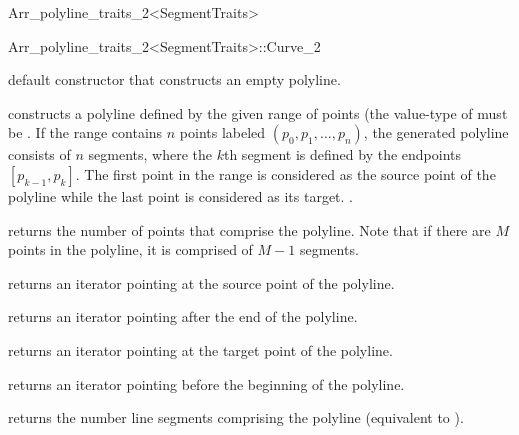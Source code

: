 \begin{ccRefClass}{Arr_polyline_traits_2<SegmentTraits>}
\begin{ccClass}{Arr_polyline_traits_2<SegmentTraits>::Curve_2}

\ccTypes



\ccCreation
{}

  {default constructor that constructs an empty polyline.}

  {constructs a polyline defined by the given range of points
   \ccc{[first, last)} (the value-type of  must be
   .
   If the range contains $n$ points labeled $(p_{0},p_{1},\ldots,p_{n})$,
   the generated polyline consists of $n$ segments, where the $k$th segment 
   is defined by the endpoints $[p_{k-1},p_{k}]$. The first point in the 
   range is considered as the source point of the polyline while the last 
   point is considered as its target.
   .}

\ccAccessFunctions

  {returns the number of points that comprise the polyline.
   Note that if there are $M$ points in the polyline, it is comprised
   of $M-1$ segments.}

  {returns an iterator pointing at the source point of the polyline.}

  {returns an iterator pointing after the end of the polyline.}

  {returns an iterator pointing at the target point of the polyline.}

  {returns an iterator pointing before the beginning of the polyline.}

  {returns the number line segments comprising the polyline
   (equivalent to ).}


\end{ccClass}
\end{ccRefClass}
